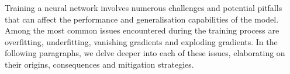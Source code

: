 Training a neural network involves numerous challenges and potential pitfalls that can affect the performance and generalisation capabilities of the model. Among the most common issues encountered during the training process are overfitting, underfitting, vanishing gradients and exploding gradients. In the following paragraphs, we delve deeper into each of these issues, elaborating on their origins, consequences and mitigation strategies.

\newcommand{\binary}{\makecell{$\Phi \colon \mathbb{R} \to \{ 0, 1 \}$\\[0.5em]$\Phi(x) = \begin{cases}
                0 & \text{if}\ x < 0   \\
                1 & \text{if}\ x \ge 0
            \end{cases}$}}
\newcommand{\sigmoid}{\makecell{$\Phi \colon \mathbb{R} \to (0, 1)$\\[0.5em]$\Phi(x) = \dfrac{1}{1 + e^{-x}}$}}
\newcommand{\htangent}{\makecell{$\Phi \colon \mathbb{R} \to (-1, 1)$\\[0.5em]$\Phi(x) = \dfrac{e^x - e^{-x}}{e^x + e^{-x}}$}}
\newcommand{\relu}{\makecell{$\Phi \colon \mathbb{R} \to [0, \infty)$\\[0.5em]$\Phi(x) =
        \begin{cases}
            0 & \text{if}\ x < 0   \\
            x & \text{if}\ x \ge 0
        \end{cases}$}}
\newcommand{\lrelu}{\makecell{$\Phi \colon \mathbb{R} \to (-\infty, \infty)$\\[0.2em]$\Phi(x) =
            \begin{cases}
                \alpha x & \text{if}\ x < 0   \\
                x        & \text{if}\ x \ge 0
            \end{cases}$\\[1em]$\alpha \in (0, 1) $}}
\newcommand{\elu}{\makecell{$\Phi \colon \mathbb{R} \to (-\alpha, \infty)$\\[0.2em]$\Phi(x) =
            \begin{cases}
                \alpha \left( e^x - 1 \right) & \text{if}\ x < 0   \\
                x                             & \text{if}\ x \ge 0
            \end{cases}$\\[1em]$\alpha \in \mathbb{R} $}}
\newcommand{\selu}{\makecell{$\Phi \colon \mathbb{R} \to (-\lambda\alpha, \infty)$\\[0.2em]$\Phi(x) =
            \begin{cases}
                \lambda\alpha \left( e^x - 1 \right) & \text{if}\ x < 0   \\
                \lambda x                            & \text{if}\ x \ge 0
            \end{cases}$\\[1em]$\lambda\,, \alpha \in \mathbb{R}$}}

